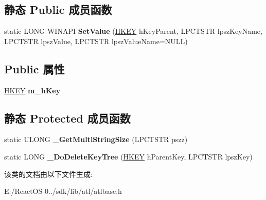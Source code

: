 \subsection*{静态 Public 成员函数}
\begin{DoxyCompactItemize}
\item 
\mbox{\label{class_a_t_l_1_1_c_reg_key_a5dde8c406997e8d34053c8b248fdba9b}} 
static L\+O\+NG W\+I\+N\+A\+PI {\bfseries Set\+Value} (\hyperlink{interfacevoid}{H\+K\+EY} h\+Key\+Parent, L\+P\+C\+T\+S\+TR lpsz\+Key\+Name, L\+P\+C\+T\+S\+TR lpsz\+Value, L\+P\+C\+T\+S\+TR lpsz\+Value\+Name=N\+U\+LL)
\end{DoxyCompactItemize}
\subsection*{Public 属性}
\begin{DoxyCompactItemize}
\item 
\mbox{\label{class_a_t_l_1_1_c_reg_key_a563d26800780c8c686d30cb233aa27e4}} 
\hyperlink{interfacevoid}{H\+K\+EY} {\bfseries m\+\_\+h\+Key}
\end{DoxyCompactItemize}
\subsection*{静态 Protected 成员函数}
\begin{DoxyCompactItemize}
\item 
\mbox{\label{class_a_t_l_1_1_c_reg_key_a80e446b13480e1b47f9cc4ca4bf8be94}} 
static U\+L\+O\+NG {\bfseries \+\_\+\+Get\+Multi\+String\+Size} (L\+P\+C\+T\+S\+TR pszz)
\item 
\mbox{\label{class_a_t_l_1_1_c_reg_key_a19047c66eed6dacf563d482d777bad08}} 
static L\+O\+NG {\bfseries \+\_\+\+Do\+Delete\+Key\+Tree} (\hyperlink{interfacevoid}{H\+K\+EY} h\+Parent\+Key, L\+P\+C\+T\+S\+TR lpsz\+Key)
\end{DoxyCompactItemize}


该类的文档由以下文件生成\+:\begin{DoxyCompactItemize}
\item 
E\+:/\+React\+O\+S-\/0../sdk/lib/atl/atlbase.\+h\end{DoxyCompactItemize}
